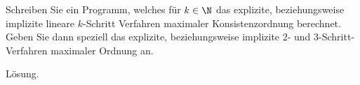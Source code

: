 \begin{exercise}
Schreiben Sie ein Programm, welches für $k \in \N$ das explizite, beziehungsweise
implizite lineare $k$-Schritt Verfahren maximaler Konsistenzordnung berechnet. Geben Sie dann speziell
das explizite, beziehungsweise implizite 2- und 3-Schritt-Verfahren maximaler Ordnung an.
\end{exercise}
\begin{solution}
Lösung.
\end{solution}
